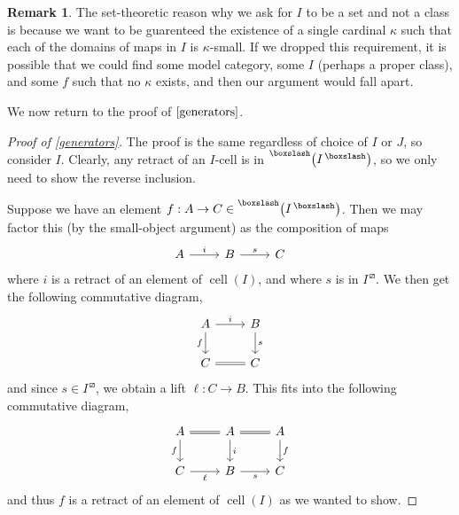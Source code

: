 \documentclass{amsart}
\DeclareMathOperator{\cell}{cell}
\theoremstyle{definition}
\newtheorem{remark}[theorem]{Remark}
\begin{document}
  \begin{remark}
    The set-theoretic reason why we ask for $I$ to be a set and not a class
    is because we want to be guarenteed the existence of a single
    cardinal $\kappa$ such that each of the domains of maps in $I$
    is $\kappa$-small. If we dropped this requirement, it is possible that
    we could find some model category, some $I$ (perhaps a proper class),
    and some $f$ such that no
    $\kappa$ exists, and then our argument would fall apart.
  \end{remark}
  We now return to the proof of $\ref{generators}$.
  \begin{proof}[Proof of \ref{generators}]
   
    The proof is the same regardless of choice of $I$ or $J$, so consider $I$.
    Clearly, any retract of an $I$-cell is in
    $\prescript{\boxslash}{}{\left( I ^{\,\boxslash}\right)}$, so we only
    need to show the reverse inclusion.

    Suppose we have an element $f:A\to C\in
    \prescript{\boxslash}{}{\left( I ^{\,\boxslash}\right)}$. Then
    we may factor this (by the small-object argument) as the
    composition of maps 
    \[
      \begin{tikzcd}
        A \arrow[r, "i"] & B \arrow[r, "s"] &C
      \end{tikzcd}
    \]
    where $i$ is a retract of an element of $\cell(I)$, and where
    $s$ is in $I^{\,\boxslash}$. We then get the following commutative diagram,
    \[
      \begin{tikzcd}
        A \arrow[d, "f"'] \arrow[r, "i"]& B \arrow[d, "s"] \\
        C \arrow[r, equals] & C
      \end{tikzcd}
    \]
    and since $s\in I^{\,\boxslash}$, we obtain a lift $\ell :
    C\to B$.
    This fits into the following commutative diagram,
    \[
      \begin{tikzcd}
        A \arrow[d, "f"'] \arrow[r, equals]& A \arrow[d, "i"] \arrow[r,equals]
        & A \arrow[d, "f"]\\
        C \arrow[r, "\ell"'] & B \arrow[r, "s"'] & C
      \end{tikzcd}
    \]
    and thus $f$ is a retract of an element of $\cell(I)$ as we wanted to show.
  \end{proof}
\end{document}
